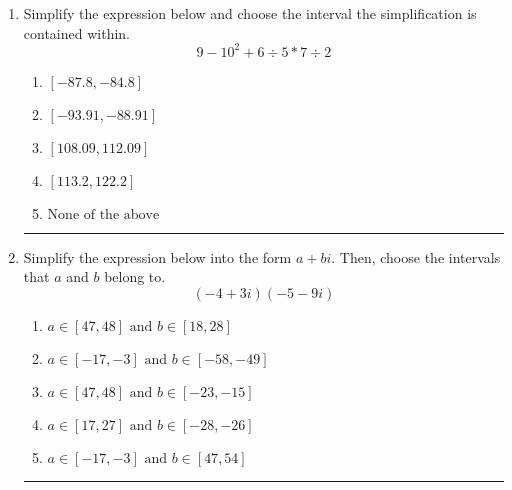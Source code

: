 \documentclass[14pt]{extbook}
\newcommand{\litem}[1]{\item#1\hspace*{-1cm}\rule{\textwidth}{0.4pt}}
\begin{document}
\begin{enumerate}
{\begin{enumerate}[label=\Alph*.]
\end{enumerate} }
\litem{
Simplify the expression below and choose the interval the simplification is contained within.\[ 9 - 10^2 + 6 \div 5 * 7 \div 2 \]\begin{enumerate}[label=\Alph*.]
\item \( [-87.8, -84.8] \)
\item \( [-93.91, -88.91] \)
\item \( [108.09, 112.09] \)
\item \( [113.2, 122.2] \)
\item \( \text{None of the above} \)

\end{enumerate} }
\litem{
Simplify the expression below into the form $a+bi$. Then, choose the intervals that $a$ and $b$ belong to.\[ (-4 + 3 i)(-5 - 9 i) \]\begin{enumerate}[label=\Alph*.]
\item \( a \in [47, 48] \text{ and } b \in [18, 28] \)
\item \( a \in [-17, -3] \text{ and } b \in [-58, -49] \)
\item \( a \in [47, 48] \text{ and } b \in [-23, -15] \)
\item \( a \in [17, 27] \text{ and } b \in [-28, -26] \)
\item \( a \in [-17, -3] \text{ and } b \in [47, 54] \)

\end{enumerate} }
\end{enumerate}
\end{document}
